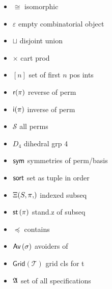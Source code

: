 \label{ch:symb}
\begin{itemize}
    \item $\cong$ isomorphic
    \item $\varepsilon$ empty combinatorial object
    \item $\sqcup$ disjoint union
    \item $\times$ cart prod
    \item $[n]$ set of first $n$ pos ints
    \item $\textsf{r}(\pi)$ reverse of perm
    \item $\textsf{i}(\pi)$ inverse of perm
    \item $\mathcal{S}$ all perms
    \item $D_4$ dihedral grp 4
    \item $\textsf{sym}$ symmetries of perm/basis
    \item $\textsf{sort}$ set as tuple in order
    \item $\sseq{S,\pi}$ indexed subseq
    \item $\textsf{st}\left(\pi\right)$ stand.z of subseq
    \item $\preceq$ contains
    \item $\textsf{Av}\left(\sigma\right)$ avoiders of
    \item $\textsf{Grid}(\mathcal{T})$ grid cls for t
    \item $\mathfrak{A}{}$ set of all specifications
\end{itemize}